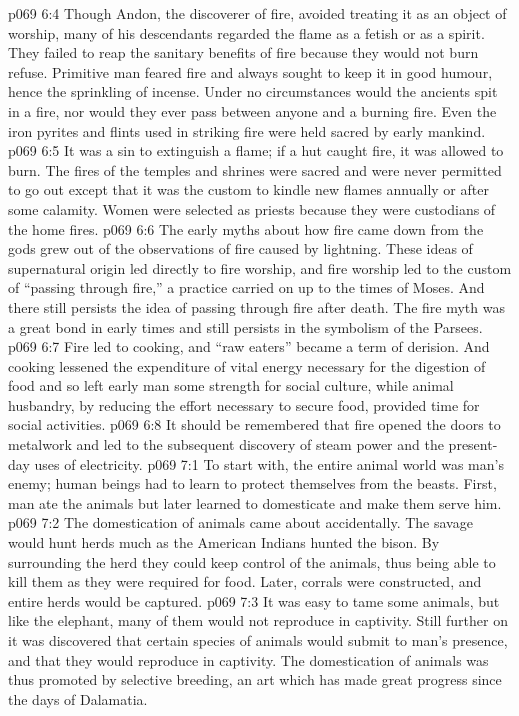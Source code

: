 \vs p069 6:4 \pc Though Andon, the discoverer of fire, avoided treating it as an object of worship, many of his descendants regarded the flame as a fetish or as a spirit. They failed to reap the sanitary benefits of fire because they would not burn refuse. Primitive man feared fire and always sought to keep it in good humour, hence the sprinkling of incense. Under no circumstances would the ancients spit in a fire, nor would they ever pass between anyone and a burning fire. Even the iron pyrites and flints used in striking fire were held sacred by early mankind.
\vs p069 6:5 It was a sin to extinguish a flame; if a hut caught fire, it was allowed to burn. The fires of the temples and shrines were sacred and were never permitted to go out except that it was the custom to kindle new flames annually or after some calamity. Women were selected as priests because they were custodians of the home fires.
\vs p069 6:6 The early myths about how fire came down from the gods grew out of the observations of fire caused by lightning. These ideas of supernatural origin led directly to fire worship, and fire worship led to the custom of “passing through fire,” a practice carried on up to the times of Moses. And there still persists the idea of passing through fire after death. The fire myth was a great bond in early times and still persists in the symbolism of the Parsees.
\vs p069 6:7 \pc Fire led to cooking, and “raw eaters” became a term of derision. And cooking lessened the expenditure of vital energy necessary for the digestion of food and so left early man some strength for social culture, while animal husbandry, by reducing the effort necessary to secure food, provided time for social activities.
\vs p069 6:8 It should be remembered that fire opened the doors to metalwork and led to the subsequent discovery of steam power and the present\hyp{}day uses of electricity.
\vs p069 7:1 To start with, the entire animal world was man’s enemy; human beings had to learn to protect themselves from the beasts. First, man ate the animals but later learned to domesticate and make them serve him.
\vs p069 7:2 The domestication of animals came about accidentally. The savage would hunt herds much as the American Indians hunted the bison. By surrounding the herd they could keep control of the animals, thus being able to kill them as they were required for food. Later, corrals were constructed, and entire herds would be captured.
\vs p069 7:3 It was easy to tame some animals, but like the elephant, many of them would not reproduce in captivity. Still further on it was discovered that certain species of animals would submit to man’s presence, and that they would reproduce in captivity. The domestication of animals was thus promoted by selective breeding, an art which has made great progress since the days of Dalamatia.
